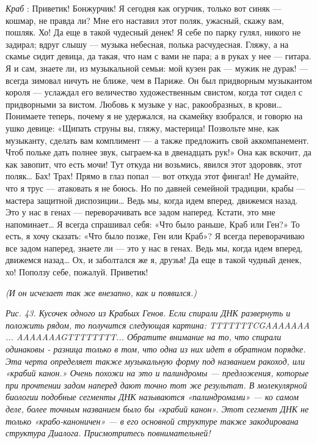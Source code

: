\emph{Краб} : Приветик! Бонжурчик! Я сегодня как огурчик, только вот синяк --- кошмар, не правда ли? Мне его наставил этот поляк, ужасный, скажу вам, пошляк. Хо! Да еще в такой чудесный денек! Я себе по парку гулял, никого не задирал; вдруг слышу --- музыка небесная, полька расчудесная. Гляжу, а на скамье сидит девица, да такая, что нам с вами не пара; а в руках у нее --- гитара. Я и сам, знаете ли, из музыкальной семьи: мой кузен рак --- мужик не дурак! --- всегда зимовал ничуть не ближе, чем в Париже. Он был придворным музыкантом короля --- услаждал его величество художественным свистом, когда тот сидел с придворными за вистом. Любовь к музыке у нас, ракообразных, в крови\ldots{} Понимаете теперь, почему я не удержался, на скамейку взобрался, и говорю на ушко девице: «Щипать струны вы, гляжу, мастерица! Позвольте мне, как музыканту, сделать вам комплимент --- а также предложить свой аккомпанемент. Чтоб польке дать полнее звук, сыграем-ка в двенадцать рук!» Она как вскочит, да как завопит, что есть мочи! Тут откуда ни возьмись, явился этот здоровяк, этот поляк\ldots{} Бах! Трах! Прямо в глаз попал --- вот откуда этот фингал! Не думайте, что я трус --- атаковать я не боюсь. Но по давней семейной традиции, крабы --- мастера защитной диспозиции\ldots{} Ведь мы, когда идем вперед, движемся назад. Это у нас в генах --- переворачивать все задом наперед. Кстати, это мне напоминает\ldots{} Я всегда спрашивал себя: «Что было раньше, Краб или Ген?» То есть, я хочу сказать: «Что было позже, Ген или Краб»? Я всегда переворачиваю все задом наперед, знаете ли --- это у нас в генах. Ведь мы, когда идем вперед, движемся назад\ldots{} Ох, и заболтался же я, друзья! Да еще в такой чудный денек, хо! Поползу себе, пожалуй. Приветик!

\emph{(И он исчезает так же внезапно, как и появился.)}

\emph{Рис. 43. Кусочек одного из Крабьих Генов. Если спирали ДНК развернуть и положить рядом, то получится следующая картина: TTTTTTTCGAAAAAAA ... AAAAAAAGTTTTTTTT... Обратите внимание на то, что спирали одинаковы - разница только в том, что одна из них идет в обратном порядке. Эта черта определяет также музыкальную форму под названием ракоход, или «крабий канон.» Очень похожи на это и палиндромы --- предложения, которые при прочтении задом наперед дают точно тот же результат. В молекулярной биологии подобные сегменты ДНК называются «палиндромами» --- ко самом деле, более точным названием было бы «крабий канон». Этот сегмент ДНК не только «крабо-каноничен» --- в его основной структуре также закодирована структура Диалога. Присмотритесь повнимательней!}

